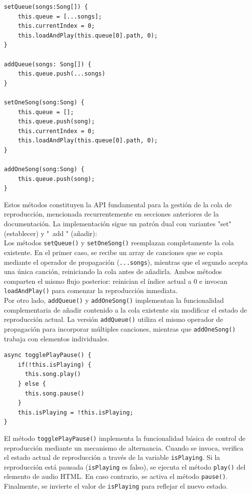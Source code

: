 \documentclass[11pt, a4paper]{article}
\begin{document}
                \begin{lstlisting}[caption={set y add}]
setQueue(songs:Song[]) {
    this.queue = [...songs];
    this.currentIndex = 0;
    this.loadAndPlay(this.queue[0].path, 0);
}

addQueue(songs: Song[]) {
    this.queue.push(...songs)
}

setOneSong(song:Song) {
    this.queue = [];
    this.queue.push(song);
    this.currentIndex = 0;
    this.loadAndPlay(this.queue[0].path, 0);
}

addOneSong(song:Song) {
    this.queue.push(song);
}
                \end{lstlisting}

                Estos métodos constituyen la API fundamental para la gestión de la cola de reproducción, mencionada recurrentemente en secciones anteriores de la documentación. La implementación sigue un patrón dual con variantes "set" (establecer) y "\ add " (añadir): \\

                Los métodos \texttt{setQueue()} y \texttt{setOneSong()} reemplazan completamente la cola existente. En el primer caso, se recibe un array de canciones que se copia mediante el operador de propagación (\texttt{...songs}), mientras que el segundo acepta una única canción, reiniciando la cola antes de añadirla. Ambos métodos comparten el mismo flujo posterior: reinician el índice actual a 0 e invocan \texttt{loadAndPlay()} para comenzar la reproducción inmediata. \\

                Por otro lado, \texttt{addQueue()} y \texttt{addOneSong()} implementan la funcionalidad complementaria de añadir contenido a la cola existente sin modificar el estado de reproducción actual. La versión \texttt{addQueue()} utiliza el mismo operador de propagación para incorporar múltiples canciones, mientras que \texttt{addOneSong()} trabaja con elementos individuales. \\

                \begin{lstlisting}[caption={togglePlayPause()}]
async togglePlayPause() {
    if(!this.isPlaying) {
      this.song.play()
    } else {
      this.song.pause()
    }
    this.isPlaying = !this.isPlaying;
}
                \end{lstlisting}
                 
                El método \texttt{togglePlayPause()} implementa la funcionalidad básica de control de reproducción mediante un mecanismo de alternancia. Cuando se invoca, verifica el estado actual de reproducción a través de la variable \texttt{isPlaying}. Si la reproducción está pausada (\texttt{isPlaying} es falso), se ejecuta el método \texttt{play()} del elemento de audio HTML. En caso contrario, se activa el método \texttt{pause()}. Finalmente, se invierte el valor de \texttt{isPlaying} para reflejar el nuevo estado.
\end{document}
